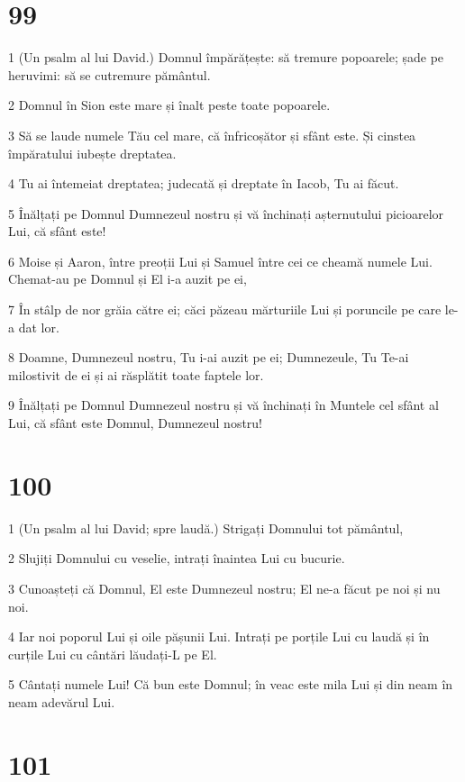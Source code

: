 \chapter{99}

\par 1 (Un psalm al lui David.) Domnul împărățește: să tremure popoarele; șade pe heruvimi: să se cutremure pământul.
\par 2 Domnul în Sion este mare și înalt peste toate popoarele.
\par 3 Să se laude numele Tău cel mare, că înfricoșător și sfânt este. Și cinstea împăratului iubește dreptatea.
\par 4 Tu ai întemeiat dreptatea; judecată și dreptate în Iacob, Tu ai făcut.
\par 5 Înălțați pe Domnul Dumnezeul nostru și vă închinați așternutului picioarelor Lui, că sfânt este!
\par 6 Moise și Aaron, între preoții Lui și Samuel între cei ce cheamă numele Lui. Chemat-au pe Domnul și El i-a auzit pe ei,
\par 7 În stâlp de nor grăia către ei; căci păzeau mărturiile Lui și poruncile pe care le-a dat lor.
\par 8 Doamne, Dumnezeul nostru, Tu i-ai auzit pe ei; Dumnezeule, Tu Te-ai milostivit de ei și ai răsplătit toate faptele lor.
\par 9 Înălțați pe Domnul Dumnezeul nostru și vă închinați în Muntele cel sfânt al Lui, că sfânt este Domnul, Dumnezeul nostru!

\chapter{100}

\par 1 (Un psalm al lui David; spre laudă.) Strigați Domnului tot pământul,
\par 2 Slujiți Domnului cu veselie, intrați înaintea Lui cu bucurie.
\par 3 Cunoașteți că Domnul, El este Dumnezeul nostru; El ne-a făcut pe noi și nu noi.
\par 4 Iar noi poporul Lui și oile pășunii Lui. Intrați pe porțile Lui cu laudă și în curțile Lui cu cântări lăudați-L pe El.
\par 5 Cântați numele Lui! Că bun este Domnul; în veac este mila Lui și din neam în neam adevărul Lui.

\chapter{101}

